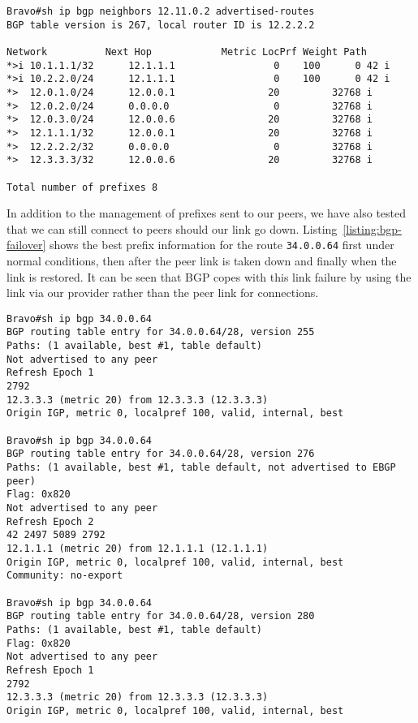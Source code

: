 \begin{lstlisting}[caption={Prefixes advertised to AS 5607}, label={listing:bravo-advert-table}]
Bravo#sh ip bgp neighbors 12.11.0.2 advertised-routes
BGP table version is 267, local router ID is 12.2.2.2

Network          Next Hop            Metric LocPrf Weight Path
*>i 10.1.1.1/32      12.1.1.1                 0    100      0 42 i
*>i 10.2.2.0/24      12.1.1.1                 0    100      0 42 i
*>  12.0.1.0/24      12.0.0.1                20         32768 i
*>  12.0.2.0/24      0.0.0.0                  0         32768 i
*>  12.0.3.0/24      12.0.0.6                20         32768 i
*>  12.1.1.1/32      12.0.0.1                20         32768 i
*>  12.2.2.2/32      0.0.0.0                  0         32768 i
*>  12.3.3.3/32      12.0.0.6                20         32768 i

Total number of prefixes 8
\end{lstlisting}

In addition to the management of prefixes sent to our peers, we have also tested that we can still connect to peers should our link go down. Listing~\ref{listing:bgp-failover} shows the best prefix information for the route \texttt{34.0.0.64} first under normal conditions, then after the peer link is taken down and finally when the link is restored. It can be seen that BGP copes with this link failure by using the link via our provider rather than the peer link for connections.

\begin{lstlisting}[caption={Failover of connection to AS 2792}, label={listing:bgp-failover}]
Bravo#sh ip bgp 34.0.0.64
BGP routing table entry for 34.0.0.64/28, version 255
Paths: (1 available, best #1, table default)
Not advertised to any peer
Refresh Epoch 1
2792
12.3.3.3 (metric 20) from 12.3.3.3 (12.3.3.3)
Origin IGP, metric 0, localpref 100, valid, internal, best

Bravo#sh ip bgp 34.0.0.64
BGP routing table entry for 34.0.0.64/28, version 276
Paths: (1 available, best #1, table default, not advertised to EBGP peer)
Flag: 0x820
Not advertised to any peer
Refresh Epoch 2
42 2497 5089 2792
12.1.1.1 (metric 20) from 12.1.1.1 (12.1.1.1)
Origin IGP, metric 0, localpref 100, valid, internal, best
Community: no-export

Bravo#sh ip bgp 34.0.0.64
BGP routing table entry for 34.0.0.64/28, version 280
Paths: (1 available, best #1, table default)
Flag: 0x820
Not advertised to any peer
Refresh Epoch 1
2792
12.3.3.3 (metric 20) from 12.3.3.3 (12.3.3.3)
Origin IGP, metric 0, localpref 100, valid, internal, best
\end{lstlisting}

